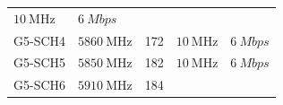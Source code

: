 \documentclass[letterpaper,11pt,ngerman]{article}
\begin{document}
\begin{onehalfspace}
\begin{longtable}[]{@{}lllll@{}}
\begin{minipage}[t]{0.14\columnwidth}
\(\SI{10}{\mega\hertz}\)\strut
\end{minipage} & \begin{minipage}[t]{0.18\columnwidth}\raggedright\strut
\(\SI{6}{Mbps}\)\strut
\end{minipage}\tabularnewline
\begin{minipage}[t]{0.08\columnwidth}\raggedright\strut
G5-SCH4\strut
\end{minipage} & \begin{minipage}[t]{0.30\columnwidth}\raggedright\strut
\(\SI{5860}{\mega\hertz}\)\strut
\end{minipage} & \begin{minipage}[t]{0.16\columnwidth}\raggedright\strut
172\strut
\end{minipage} & \begin{minipage}[t]{0.14\columnwidth}\raggedright\strut
\(\SI{10}{\mega\hertz}\)\strut
\end{minipage} & \begin{minipage}[t]{0.18\columnwidth}\raggedright\strut
\(\SI{6}{Mbps}\)\strut
\end{minipage}\tabularnewline
\begin{minipage}[t]{0.08\columnwidth}\raggedright\strut
G5-SCH5\strut
\end{minipage} & \begin{minipage}[t]{0.30\columnwidth}\raggedright\strut
\(\SI{5850}{\mega\hertz}\)\strut
\end{minipage} & \begin{minipage}[t]{0.16\columnwidth}\raggedright\strut
182\strut
\end{minipage} & \begin{minipage}[t]{0.14\columnwidth}\raggedright\strut
\(\SI{10}{\mega\hertz}\)\strut
\end{minipage} & \begin{minipage}[t]{0.18\columnwidth}\raggedright\strut
\(\SI{6}{Mbps}\)\strut
\end{minipage}\tabularnewline
\begin{minipage}[t]{0.08\columnwidth}\raggedright\strut
G5-SCH6\strut
\end{minipage} & \begin{minipage}[t]{0.30\columnwidth}\raggedright\strut
\(\SI{5910}{\mega\hertz}\)\strut
\end{minipage} & \begin{minipage}[t]{0.16\columnwidth}\raggedright\strut
184\strut
\end{minipage} & \begin{minipage}[t]{0.14\columnwidth}\raggedright\strut

\end{minipage}
\end{longtable}
\end{onehalfspace}
\end{document}
